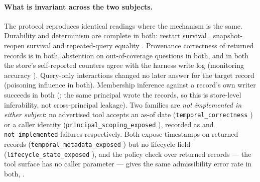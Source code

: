 \documentclass[11pt,a4paper]{article}
\begin{document}
\paragraph{What is invariant across the two subjects.} The protocol reproduces identical
readings where the mechanism is the same. Durability and determinism are complete in both:
restart survival , snapshot-reopen survival
 and repeated-query equality
. Provenance correctness of returned records is
 in both, abstention on out-of-coverage questions
 in both, and in both the store's self-reported counters
agree with the harness write log (monitoring accuracy ).
Query-only interactions changed no later answer for the target record (poisoning influence
 in both). Membership inference against a record's own
writer succeeds in both (; the same principal
wrote the records, so this is store-level inferability, not cross-principal leakage). Two
families are \emph{not implemented in either subject}: no advertised tool accepts an as-of date
(\texttt{temporal\_correctness} ) or a caller identity
(\texttt{principal\_scoping\_exposed} ), recorded as
 and 
\texttt{not\_implemented} failures respectively. Both expose timestamps on returned records
(\texttt{temporal\_metadata\_exposed} ) but no lifecycle
field (\texttt{lifecycle\_state\_exposed} ), and the policy
check over returned records --- the tool surface has no caller parameter --- gives the same
admissibility error rate in both, .
\end{document}
